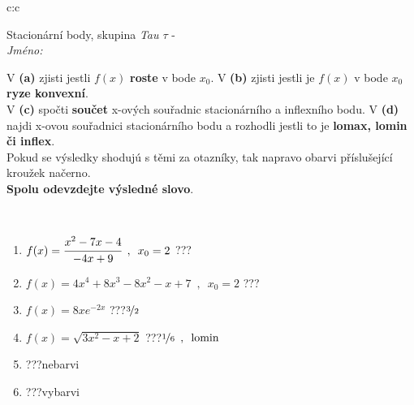 \documentclass[10pt]{report}
\begin{document}
\newpage
\thispagestyle{empty}
\begin{tabular}{c:c}
\begin{minipage}[c][104.5mm][t]{0.5\linewidth}
\begin{center}
\vspace{7mm}
{\huge Stacionární body, skupina \textit{Tau $\tau$} -}\\[5mm]
\textit{Jméno:}\phantom{xxxxxxxxxxxxxxxxxxxxxxxxxxxxxxxxxxxxxxxxxxxxxxxxxxxxxxxxxxxxxxxxx}\\[5mm]
\begin{minipage}{0.95\linewidth}
\begin{center}
{\small V \textbf{(a)} zjisti jestli $f(x)$ \textbf{roste} v bode $x_0$. V \textbf{(b)} zjisti jestli je $f(x)$ v bode $x_0$ \textbf{ryze konvexní}.\\V \textbf{(c)} spočti \textbf{součet} x-ových souřadnic stacionárního a inflexního bodu. V \textbf{(d)} najdi x-ovou souřadnici stacionárního bodu a rozhodli jestli to je \textbf{lomax, lomin či inflex}.\\Pokud se výsledky shodujú s těmi za otazníky, tak napravo obarvi příslušející kroužek načerno.\\\textbf{Spolu odevzdejte výsledné slovo}}.
\end{center}
\end{minipage}
\\[1mm]
\begin{minipage}{0.79\linewidth}
\begin{center}
\begin{varwidth}{\linewidth}
\begin{enumerate}
\normalsize
\item $f(x)=\cfrac{x^2-7x-4}{-4x+9}\enspace , \enspace x_0=2$\quad \dotfill\; ???\;\dotfill \quad {}
\item $f(x)=4x^4+8x^3-8x^2-x+7\enspace , \enspace x_0=2$\quad \dotfill\; ???\;\dotfill \quad {}
\item $f(x)=8xe^{-2x}$\quad \dotfill\; ???\;\dotfill \quad $\nicefrac{3}{2}$
\item $f(x)=\sqrt{3x^2-x+2}$\quad \dotfill\; ???\;\dotfill \quad $\nicefrac{1}{6}\enspace , \enspace \mathrm{lomin}$
\item \quad \dotfill\; ???\;\dotfill \quad nebarvi
\item \quad \dotfill\; ???\;\dotfill \quad vybarvi
\end{enumerate}
\end{varwidth}
\end{center}

\end{minipage}
\end{center}
\end{minipage}
\end{tabular}
\end{document}
